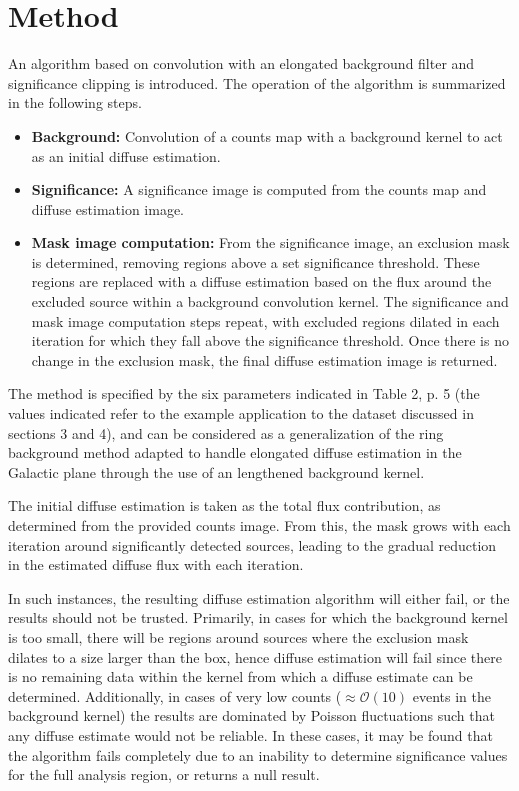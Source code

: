 \documentclass{PoS}
\begin{document}
\section{Method}

An algorithm based on convolution with an elongated background filter and significance clipping is introduced. The operation of the algorithm is summarized in the following steps.

\begin{itemize}[noitemsep,nolistsep]
\item \textbf{Background:} Convolution of a counts map with a background kernel to act as an initial diffuse estimation.
\item \textbf{Significance:} A significance image is computed from the counts map and diffuse estimation image.
\item \textbf{Mask image computation:} From the significance image, an exclusion mask is determined, removing regions above a set significance threshold. These regions are replaced with a diffuse estimation based on the flux around the excluded source within a background convolution kernel. The significance and mask image computation steps repeat, with excluded regions dilated in each iteration for which they fall above the significance threshold. Once there is no change in the exclusion mask, the final diffuse estimation image is returned.
\end{itemize}

The method is specified by the six parameters indicated in Table 2, p. 5 (the values indicated refer to the example application to the dataset discussed in sections 3 and 4), and can be considered as a generalization of the ring background method \cite{berge} adapted to handle elongated diffuse estimation in the Galactic plane through the use of an lengthened background kernel.

The initial diffuse estimation is taken as the total flux contribution, as determined from the provided counts image. From this, the mask grows with each iteration around significantly detected sources, leading to the gradual reduction in the estimated diffuse flux with each iteration.

In such instances, the resulting diffuse estimation algorithm will either fail, or the results should not be trusted. Primarily, in cases for which the background kernel is too small, there will be regions around sources where the exclusion mask dilates to a size larger than the box, hence diffuse estimation will fail since there is no remaining data within the kernel from which a diffuse estimate can be determined. Additionally, in cases of very low counts ($\approx \mathcal{O}(10)$ events in the background kernel) the results are dominated by Poisson fluctuations such that any diffuse estimate would not be reliable. In these cases, it may be found that the algorithm fails completely due to an inability to determine significance values for the full analysis region, or returns a null result.
\end{document}
